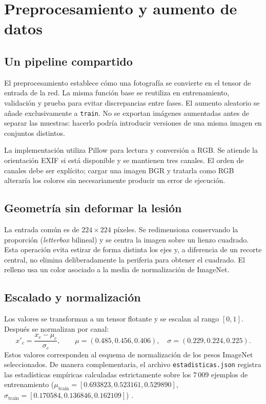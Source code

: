 \FloatBarrier\section{Preprocesamiento y aumento de datos}

\subsection{Un pipeline compartido}
El preprocesamiento establece cómo una fotografía se convierte en el tensor de entrada de la red. La misma función base se reutiliza en entrenamiento, validación y prueba para evitar discrepancias entre fases. El aumento aleatorio se añade exclusivamente a \texttt{train}. No se exportan imágenes aumentadas antes de separar las muestras: hacerlo podría introducir versiones de una misma imagen en conjuntos distintos.

La implementación utiliza Pillow para lectura y conversión a RGB. Se atiende la orientación EXIF si está disponible y se mantienen tres canales. El orden de canales debe ser explícito; cargar una imagen BGR y tratarla como RGB alteraría los colores sin necesariamente producir un error de ejecución.

\subsection{Geometría sin deformar la lesión}
La entrada común es de $224\times224$ píxeles. Se redimensiona conservando la proporción (\textit{letterbox} bilineal) y se centra la imagen sobre un lienzo cuadrado. Esta operación evita estirar de forma distinta los ejes y, a diferencia de un recorte central, no elimina deliberadamente la periferia para obtener el cuadrado. El relleno usa un color asociado a la media de normalización de ImageNet.


\subsection{Escalado y normalización}
Los valores se transforman a un tensor flotante y se escalan al rango $[0,1]$. Después se normalizan por canal:
\begin{equation}
x'_c=\frac{x_c-\mu_c}{\sigma_c},\qquad
\mu=(0.485,0.456,0.406),\quad
\sigma=(0.229,0.224,0.225).
\end{equation}
Estos valores corresponden al esquema de normalización de los pesos ImageNet seleccionados. De manera complementaria, el archivo \texttt{estadisticas.json} registra las estadísticas empíricas calculadas estrictamente sobre los 7\,009 ejemplos de entrenamiento ($\mu_{\mathrm{train}}=[0.693823, 0.523161, 0.529890]$, $\sigma_{\mathrm{train}}=[0.170584, 0.136846, 0.162109]$) \cite{torchvisiondocs}.

